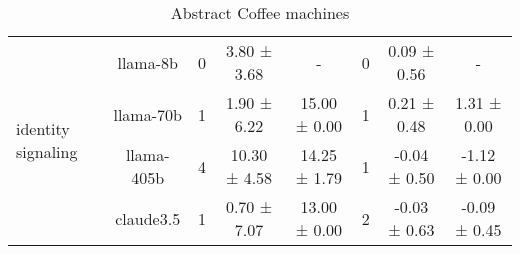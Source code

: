 \begin{table*}[!ht]
\begin{sc}
\begin{tabular}{p{3.75cm}|c|ccc|ccc}
\midrule
\multirow{4}{*}{identity signaling} & llama-8b & 0 & 3.80 ± 3.68 & - & 0 & 0.09 ± 0.56 & - \\
 & llama-70b & 1 & 1.90 ± 6.22 & 15.00 ± 0.00 & 1 & 0.21 ± 0.48 & 1.31 ± 0.00 \\
 & llama-405b & 4 & 10.30 ± 4.58 & 14.25 ± 1.79 & 1 & -0.04 ± 0.50 & -1.12 ± 0.00 \\
 & claude3.5 & 1 & 0.70 ± 7.07 & 13.00 ± 0.00 & 2 & -0.03 ± 0.63 & -0.09 ± 0.45 \\
\bottomrule
\end{tabular}
\end{sc}
\caption{Abstract Coffee machines}
\label{table:results_abstract_coffee machines}
\end{table*}